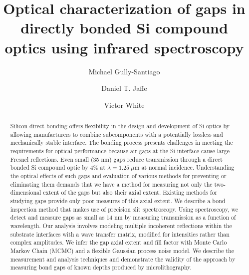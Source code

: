 \documentclass[osajnl,preprint,showpacs,superscriptaddress,12pt]{revtex4-1} %
\begin{document}
\title{Optical characterization of gaps in directly bonded Si compound optics using infrared spectroscopy}

\author{Michael Gully-Santiago}
\author{Daniel T. Jaffe}

\author{Victor White}


\begin{abstract}
Silicon direct bonding offers flexibility in the design and development of Si optics by allowing manufacturers to combine subcomponents with a potentially lossless and mechanically stable interface. The bonding process presents challenges in meeting the requirements for optical performance because air gaps at the Si interface cause large Fresnel reflections. Even small (35 nm) gaps reduce transmission through a direct bonded Si compound optic by 4\% at $\lambda = 1.25 \; \mu$m at normal incidence. Understanding the optical effects of such gaps and evaluation of various methods for preventing or eliminating them demands that we have a method for measuring not only the two-dimensional extent of the gaps but also their axial extent.  Existing methods for studying gaps provide only poor measures of this axial extent.  We describe a bond inspection method that makes use of precision slit spectroscopy.  Using spectroscopy, we detect and measure gaps as small as 14 nm by measuring transmission as a function of wavelength. Our analysis involves modeling multiple incoherent reflections within the substrate interfaces with a wave transfer matrix, modified for intensities rather than complex amplitudes. We infer the gap axial extent and fill factor with Monte Carlo Markov Chain (MCMC) and a flexible Gaussian process noise model.  We describe the measurement and analysis techniques and demonstrate the validity of the approach by measuring bond gaps of known depths produced by microlithography.
\end{abstract}


\maketitle %
\end{document}
